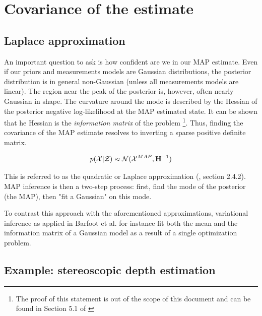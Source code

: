 \section{Covariance of the estimate}
\subsection{Laplace approximation}
\label{sec:map_covariance}
An important question to ask is how confident are we in our MAP estimate. Even if our priors and measurements models are Gaussian distributions, the posterior distribution
is in general non-Gaussian (unless all measurements models are linear). The region near the peak of the posterior is, however, often nearly Gaussian in shape.
The curvature around the mode is described by the Hessian of the posterior negative log-likelihood at the MAP estimated state. 
It can be shown that he Hessian is the \textit{information matrix} of the problem \footnote{The proof of this statement is out of the scope of this document and can be found in Section 5.1 of
\cite{peng2018advanced}}. Thus, finding the covariance of the MAP estimate resolves to inverting a 
sparse positive definite matrix.

\begin{equation}
    p(\mathcal{X} | \mathcal{Z}) \approx \mathcal{N}({\mathcal{X}^{MAP}},{{\bf H}^{-1}})
    \label{eq:map_laplace}
\end{equation}

This is referred to as the quadratic or Laplace approximation (\cite{mcelreath2018statistical}, section 2.4.2). MAP inference is then a two-step process: 
first, find the mode of the posterior (the MAP), then "fit a Gaussian" on this mode. 

To contrast this approach with the aforementioned approximations, variational inference as applied in Barfoot et al. 
 \cite{barfoot2020exactly} for instance fit both the mean and the information matrix of a Gaussian model as a result of a single optimization problem.



\subsection{Example: stereoscopic depth estimation}

